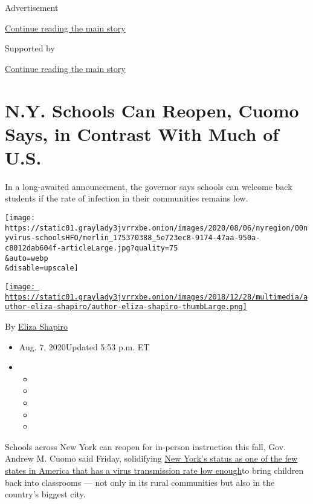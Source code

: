 Advertisement

\protect\hyperlink{after-top}{Continue reading the main story}

Supported by

\protect\hyperlink{after-sponsor}{Continue reading the main story}

\hypertarget{ny-schools-can-reopen-cuomo-says-in-contrast-with-much-of-us}{%
\section{N.Y. Schools Can Reopen, Cuomo Says, in Contrast With Much of
U.S.}\label{ny-schools-can-reopen-cuomo-says-in-contrast-with-much-of-us}}

In a long-awaited announcement, the governor says schools can welcome
back students if the rate of infection in their communities remains low.

\texttt{[image: https://static01.graylady3jvrrxbe.onion/images/2020/08/06/nyregion/00nyvirus-schoolsHFO/merlin\_175370388\_5e723ec8-9174-47aa-950a-c8012dab604f-articleLarge.jpg?quality=75\\\&auto=webp\\\&disable=upscale]}

\href{https://www.nytimes3xbfgragh.onion/by/eliza-shapiro}{\texttt{[image: https://static01.graylady3jvrrxbe.onion/images/2018/12/28/multimedia/author-eliza-shapiro/author-eliza-shapiro-thumbLarge.png]}}

By \href{https://www.nytimes3xbfgragh.onion/by/eliza-shapiro}{Eliza
Shapiro}

\begin{itemize}
\item
  Aug. 7, 2020Updated 5:53 p.m. ET
\item
  \begin{itemize}
  \item
  \item
  \item
  \item
  \item
  \end{itemize}
\end{itemize}

Schools across New York can reopen for in-person instruction this fall,
Gov. Andrew M. Cuomo said Friday, solidifying
\href{https://www.nytimes3xbfgragh.onion/2020/08/05/nyregion/nyc-schools-reopening.html}{New
York's status as one of the few states in America that has a virus
transmission rate low enough}to bring children back into classrooms ---
not only in its rural communities but also in the country's biggest
city.

